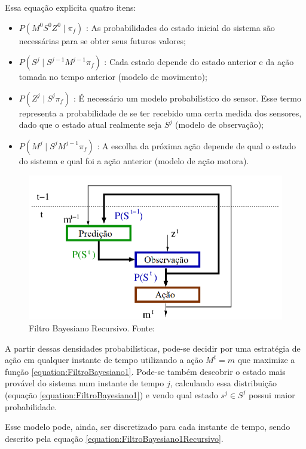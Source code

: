Essa equação explicita quatro itens:

\begin{itemize}
  \item $ P \left( M^0 S^0 Z^0 \mid \pi_f \right) $ : As probabilidades do estado inicial do sistema são necessárias para se obter seus futuros valores;
  \item $ P \left( S^j \mid S^{j-1} M^{j-1} \pi_f \right) $ : Cada estado depende do estado anterior e da ação tomada no tempo anterior (modelo de movimento);
  \item $ P \left( Z^j \mid S^j \pi_f \right) $ : É necessário um modelo probabilístico do sensor. Esse termo representa a probabilidade de se ter recebido uma certa medida dos sensores, dado que o estado atual realmente seja $ S^j $ (modelo de observação);
  \item $ P \left( M^j \mid S^j M^{j-1} \pi_f \right) $ : A escolha da próxima ação depende de qual o estado do sistema e qual foi a ação anterior (modelo de ação motora).
\end{itemize}

\begin{figure}[h]
    \centering
    \includegraphics[width=120mm]{images/modelo_bayesiano-carla}
    \caption{\label{img:ModeloProbabilisticoCarla}Filtro Bayesiano Recursivo. Fonte: \cite{Koike:2005}}
\end{figure}

A partir dessas densidades probabilísticas, pode-se decidir por uma estratégia de ação em qualquer instante de tempo utilizando a ação $ M^t = m $ que maximize a função \ref{equation:FiltroBayesiano1}. Pode-se também descobrir o estado mais provável do sistema num instante de tempo $ j $, calculando essa distribuição (equação \ref{equation:FiltroBayesiano1}) e vendo qual estado $ s^j \in S^j $ possui maior probabilidade.

Esse modelo pode, ainda, ser discretizado para cada instante de tempo, sendo descrito pela equação \ref{equation:FiltroBayesiano1Recursivo}.

